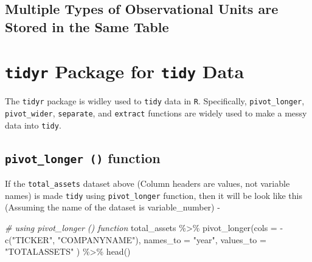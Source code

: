 \documentclass[
]{book}
\newenvironment{Shaded}{\begin{snugshade}}{\end{snugshade}}
\newcommand{\AttributeTok}[1]{\textcolor[rgb]{0.77,0.63,0.00}{#1}}
\newcommand{\CommentTok}[1]{\textcolor[rgb]{0.56,0.35,0.01}{\textit{#1}}}
\newcommand{\FunctionTok}[1]{\textcolor[rgb]{0.00,0.00,0.00}{#1}}
\newcommand{\NormalTok}[1]{#1}
\newcommand{\SpecialCharTok}[1]{\textcolor[rgb]{0.00,0.00,0.00}{#1}}
\newcommand{\StringTok}[1]{\textcolor[rgb]{0.31,0.60,0.02}{#1}}
\begin{document}
\hypertarget{multiple-types-of-observational-units-are-stored-in-the-same-table}{%
\subsection{Multiple Types of Observational Units are Stored in the Same Table}\label{multiple-types-of-observational-units-are-stored-in-the-same-table}}

\hypertarget{section}{%
\subsection{}\label{section}}

\hypertarget{tidyr-package-for-tidy-data}{%
\section{\texorpdfstring{\texttt{tidyr} Package for \texttt{tidy} Data}{tidyr Package for tidy Data}}\label{tidyr-package-for-tidy-data}}

The \texttt{tidyr} package is widley used to \texttt{tidy} data in \texttt{R}. Specifically, \texttt{pivot\_longer}, \texttt{pivot\_wider}, \texttt{separate}, and \texttt{extract} functions are widely used to make a messy data into \texttt{tidy}.

\hypertarget{pivot_longer-function}{%
\subsection{\texorpdfstring{\texttt{pivot\_longer\ ()} function}{pivot\_longer () function}}\label{pivot_longer-function}}

If the \texttt{total\_assets} dataset above (Column headers are values, not variable names) is made \texttt{tidy} using \texttt{pivot\_longer} function, then it will be look like this (Assuming the name of the dataset is variable\_number) -

\begin{Shaded}
\begin{Highlighting}[]
\CommentTok{\# using pivot\_longer () function }
\NormalTok{total\_assets }\SpecialCharTok{\%\textgreater{}\%} 
  \FunctionTok{pivot\_longer}\NormalTok{(}\AttributeTok{cols =} \SpecialCharTok{{-}}\FunctionTok{c}\NormalTok{(}\StringTok{"TICKER"}\NormalTok{, }\StringTok{"COMPANYNAME"}\NormalTok{),}
               \AttributeTok{names\_to =} \StringTok{"year"}\NormalTok{,}
               \AttributeTok{values\_to =} \StringTok{"TOTALASSETS"}
\NormalTok{               ) }\SpecialCharTok{\%\textgreater{}\%} 
  \FunctionTok{head}\NormalTok{()}
\end{Highlighting}
\end{Shaded}
\end{document}
